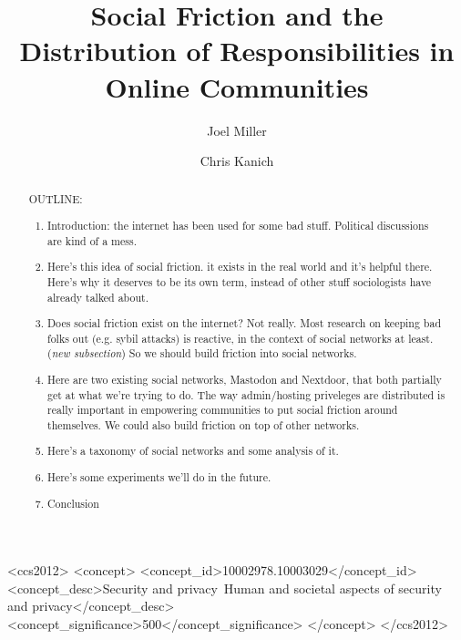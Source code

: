 \documentclass[sigconf,authordraft]{acmart}
\begin{document}
\title{Social Friction and the Distribution of Responsibilities in Online Communities}

%

\author{Joel Miller}

\author{Chris Kanich}







\begin{abstract}
OUTLINE:
\begin{enumerate}
    \item Introduction: the internet has been used for some bad stuff. Political discussions are kind of a mess.\\
    \item Here's this idea of social friction. it exists in the real world and it's helpful there. Here's why it deserves to be its own term, instead of other stuff sociologists have already talked about.\\
    \item Does social friction exist on the internet? Not really. Most research on keeping bad folks out (e.g. sybil attacks) is reactive, in the context of social networks at least. (\textit{new subsection}) So we should build friction into social networks.\\ 
    \item Here are two existing social networks, Mastodon and Nextdoor, that both partially get at what we're trying to do. The way admin/hosting priveleges are distributed is really important in empowering communities to put social friction around themselves. We could also build friction on top of other networks. \\
    \item Here's a taxonomy of social networks and some analysis of it. \\
    \item Here's some experiments we'll do in the future.\\
    \item Conclusion \\
\end{enumerate}
\end{abstract}


\begin{CCSXML}
<ccs2012>
   <concept>
       <concept_id>10002978.10003029</concept_id>
       <concept_desc>Security and privacy~Human and societal aspects of security and privacy</concept_desc>
       <concept_significance>500</concept_significance>
       </concept>
 </ccs2012>
\end{CCSXML}
\end{document}
